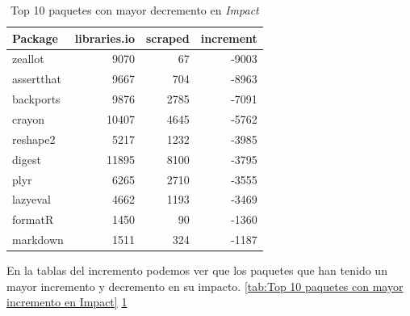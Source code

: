\begin{table}[ht!]
    \begin{center}
        \begin{tabular}{|l|r|r|r|}
            \hline
            \textbf{Package} & \textbf{libraries.io} & \textbf{scraped} & \textbf{increment} \\
            \hline
            zeallot          & 9070                  & 67               & -9003              \\
            assertthat       & 9667                  & 704              & -8963              \\
            backports        & 9876                  & 2785             & -7091              \\
            crayon           & 10407                 & 4645             & -5762              \\
            reshape2         & 5217                  & 1232             & -3985              \\
            digest           & 11895                 & 8100             & -3795              \\
            plyr             & 6265                  & 2710             & -3555              \\
            lazyeval         & 4662                  & 1193             & -3469              \\
            formatR          & 1450                  & 90               & -1360              \\
            markdown         & 1511                  & 324              & -1187              \\
            \hline
        \end{tabular}
    \end{center}
    \caption{Top 10 paquetes con mayor decremento en \textit{Impact}}
    \label{tab:Top 10 paquetes con mayor decremento en Impact}
\end{table}


En la tablas del incremento podemos ver que los paquetes que han tenido un mayor incremento y decremento
en su impacto. \ref{tab:Top 10 paquetes con mayor incremento en Impact} \ref{tab:Top 10 paquetes con mayor decremento en Impact}



